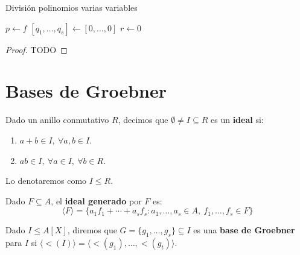 \begin{algorithm}[hbt!]
  \caption{División polinomios varias variables}\label{alg:two}
  $p\gets f$\;
  $\left[q_1,\dots, q_s\right] \gets \left[0,\dots, 0\right]$\;
  $r\gets 0$\;

\end{algorithm}

\begin{proof}
  TODO
\end{proof}
\section{Bases de Groebner}

\begin{definicion}
  Dado un anillo conmutativo $R$, decimos que $\emptyset \neq I \subseteq R$ es un \textbf{ideal} si:
  \begin{enumerate}
    \item $a+b\in I,\ \forall a,b\in I$.
    \item $ab\in I,\ \forall a\in I,\ \forall b\in R$.
  \end{enumerate}

  Lo denotaremos como $I\le R$.
\end{definicion}

\begin{definicion}
  Dado $F\subseteq A$, el \textbf{ideal generado} por $F$ es:
  \begin{equation*}
    \langle F \rangle = \{a_1f_1 + \cdots + a_sf_s : a_1,\dots, a_s\in A,\ f_1,\dots, f_s\in F\}
  \end{equation*}
\end{definicion}

\begin{definicion}
  Dado $I\le A[X]$, diremos que $G = \{g_1,\dots, g_s\}\subseteq I$ es una \textbf{base de Groebner} para $I$ si $\langle \lt(I)\rangle = \langle \lt(g_1),\dots, \lt(g_t) \rangle$.
\end{definicion}

